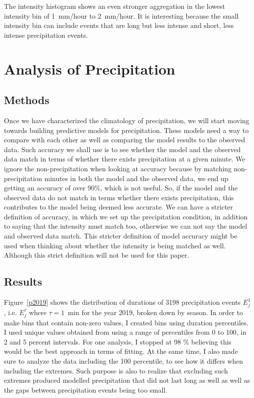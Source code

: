 \documentclass[11pt]{report}
\begin{document}
The intensity histogram shows an even stronger aggregation in the lowest
intensity bin of 1~mm/hour to 2~mm/hour. It is interesting because the small
intensity bin can include events that are long but less intense and short,
less intense precipitation events.

\section{Analysis of Precipitation}\label{sec:apc}


\subsection{Methods}\label{sec:methods}

Once we have characterized the climatology of precipitation, we will start moving towards building predictive models for precipitation. These models need a way to compare with each other as well as comparing the model results to the observed data. Such
accuracy we shall use is to see whether the model and the observed data match in terms of whether there exists precipitation at a given minute. We
ignore the non-precipitation when looking at accuracy because by matching
non-precipitation minutes in both the model and the observed data, we end up
getting an accuracy of over 90\%, which is not useful. So, if the model and the
observed data do not match in terms whether there exists precipitation, this
contributes to the model being deemed less accurate. We can have a stricter
definition of accuracy, in which we set up the precipitation condition, in
addition to saying that the intensity must match too, otherwise we can not
say the model and observed data match. This stricter definition of model
accuracy might be used when thinking about whether the intensity is being matched as well. Although this strict definition will not be used for this paper. 

\subsection{Results}\label{sec:apcr}

Figure~\ref{p2019} shows the distribution of durations of 3198 precipitation
events $E_j^1$, i.e. $E_j^\tau$ where $\tau=1$~min for the year 2019, broken
down by season. In order to make bins that contain non-zero values, I
created bins using duration percentiles. I used unique values obtained from
using a range of percentiles from 0 to 100, in 2 and 5 percent
intervals. For one analysis, I stopped at 98 \% believing this would be the
best approach in terms of fitting. At the same time, I also made sure to
analyze the data including the 100 percentile, to see how it differs when
including the extremes. Such purpose is also to realize that excluding such
extremes produced modelled precipitation that did not last long as well as
well as the gaps between precipitation events being too small.
\end{document}
